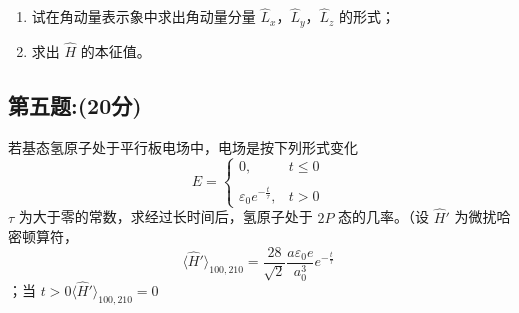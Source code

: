 \begin{enumerate}
    \item 试在角动量表示象中求出角动量分量 $\hat{L}_x$，$\hat{L}_y$，$\hat{L}_z$ 的形式；
    \item 求出 $\hat{H}$ 的本征值。
\end{enumerate}
\subsection{第五题:(20分)}
若基态氢原子处于平行板电场中，电场是按下列形式变化
$$E = \begin{cases} 0, & t \leq 0 \\\\\varepsilon_0 e^{-\frac{t}{\tau}}, & t > 0\end{cases}~$$
$\tau$ 为大于零的常数，求经过长时间后，氢原子处于 $2P$ 态的几率。（设 $\hat{H}'$ 为微扰哈密顿算符，
$$\langle \hat{H}' \rangle_{100,210} = \frac{28}{\sqrt{2}} \frac{a\varepsilon_0 e}{a_0^3} e^{-\frac{t}{\tau}}~$$；当  $t > 0 \langle \hat{H}' \rangle_{100,210} = 0 $
